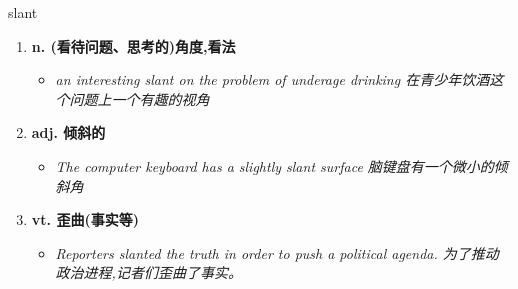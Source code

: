 
\begin{frame}
{\huge slant}
\begin{center}
\begin{enumerate}\Large
  \item \textbf{n. (看待问题、思考的)角度,看法}
  \begin{itemize}
    \item \em{\Large{an interesting slant on the problem of underage drinking 在青少年饮酒这个问题上一个有趣的视角}}
  \end{itemize}
  \item \textbf{adj. 倾斜的}
  \begin{itemize}
    \item \em{\Large{The computer keyboard has a slightly slant surface 脑键盘有一个微小的倾斜角}}
  \end{itemize}
  \item \textbf{vt. 歪曲(事实等)}
  \begin{itemize}
    \item \em{\Large{Reporters slanted the truth in order to push a political agenda. 为了推动政治进程,记者们歪曲了事实。}}
  \end{itemize}
\end{enumerate}
\end{center}
\end{frame}
